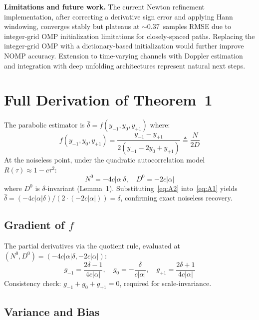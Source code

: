 \documentclass[a4paper,fleqn]{cas-dc}
\begin{document}
\textbf{Limitations and future work.} The current Newton refinement implementation, after correcting a derivative sign error and applying Hann windowing, converges stably but plateaus at $\sim$0.37~samples RMSE due to integer-grid OMP initialization limitations for closely-spaced paths. Replacing the integer-grid OMP with a dictionary-based initialization would further improve NOMP accuracy. Extension to time-varying channels with Doppler estimation and integration with deep unfolding architectures represent natural next steps.

\appendix
\section{Full Derivation of Theorem~1}
\label{app:theorem1}

The parabolic estimator is $\hat{\delta} = f(y_{-1}, y_0, y_{+1})$ where:
\begin{equation}
f(y_{-1}, y_0, y_{+1}) = \frac{y_{-1} - y_{+1}}{2(y_{-1} - 2y_0 + y_{+1})} \triangleq \frac{N}{2D}
\label{eq:A1}
\end{equation}
At the noiseless point, under the quadratic autocorrelation model $R(\tau) \approx 1 - c\tau^2$:
\begin{equation}
N^0 = -4c|\alpha|\delta, \quad D^0 = -2c|\alpha|
\label{eq:A2}
\end{equation}
where $D^0$ is $\delta$-invariant (Lemma~1). Substituting~\eqref{eq:A2} into~\eqref{eq:A1} yields $\hat{\delta} = (-4c|\alpha|\delta) / (2 \cdot (-2c|\alpha|)) = \delta$, confirming exact noiseless recovery.

\subsection{Gradient of \texorpdfstring{$f$}{f}}

The partial derivatives via the quotient rule, evaluated at $(N^0, D^0) = (-4c|\alpha|\delta, -2c|\alpha|)$:
\begin{equation}
g_{-1} = \frac{2\delta - 1}{4c|\alpha|}, \quad
g_0    = -\frac{\delta}{c|\alpha|}, \quad
g_{+1} = \frac{2\delta + 1}{4c|\alpha|}
\label{eq:A4}
\end{equation}
Consistency check: $g_{-1} + g_0 + g_{+1} = 0$, required for scale-invariance.

\subsection{Variance and Bias}
\end{document}
